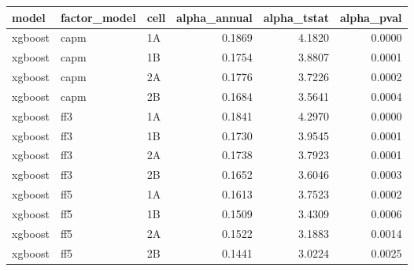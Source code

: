 \begin{tabular}{lllrrr}
\toprule
model & factor_model & cell & alpha_annual & alpha_tstat & alpha_pval \\
\midrule
xgboost & capm & 1A & 0.1869 & 4.1820 & 0.0000 \\
xgboost & capm & 1B & 0.1754 & 3.8807 & 0.0001 \\
xgboost & capm & 2A & 0.1776 & 3.7226 & 0.0002 \\
xgboost & capm & 2B & 0.1684 & 3.5641 & 0.0004 \\
xgboost & ff3 & 1A & 0.1841 & 4.2970 & 0.0000 \\
xgboost & ff3 & 1B & 0.1730 & 3.9545 & 0.0001 \\
xgboost & ff3 & 2A & 0.1738 & 3.7923 & 0.0001 \\
xgboost & ff3 & 2B & 0.1652 & 3.6046 & 0.0003 \\
xgboost & ff5 & 1A & 0.1613 & 3.7523 & 0.0002 \\
xgboost & ff5 & 1B & 0.1509 & 3.4309 & 0.0006 \\
xgboost & ff5 & 2A & 0.1522 & 3.1883 & 0.0014 \\
xgboost & ff5 & 2B & 0.1441 & 3.0224 & 0.0025 \\
\bottomrule
\end{tabular}
